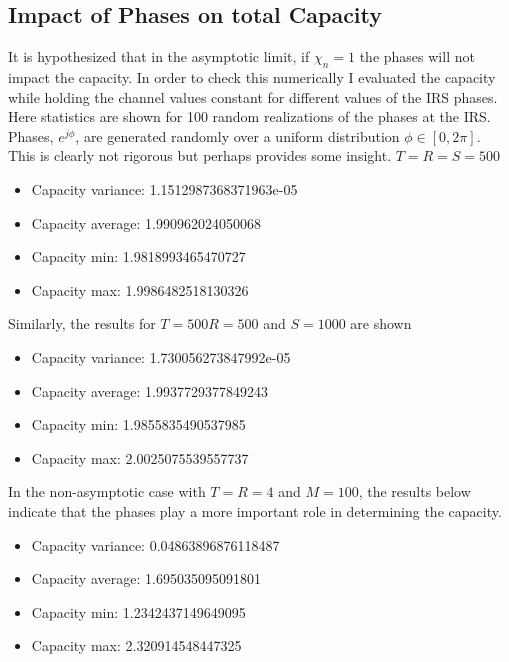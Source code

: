 \documentclass[12pt,a4paper]{report}
\begin{document}
\subsection{Impact of Phases on total Capacity}\label{phase_impact}
It is hypothesized that in the asymptotic limit, if $\chi_n = 1$ the phases will not impact the capacity. In order to check this numerically I evaluated the capacity while holding the channel values constant for different values of the IRS phases. Here statistics are shown for 100 random realizations of the phases at the IRS. 
Phases, $e^{j\phi}$, are generated randomly over a uniform distribution $\phi \in [0,2\pi]$. This is clearly not rigorous but perhaps provides some insight. 
$T = R = S = 500$
\begin{itemize}
\item
Capacity variance:
 1.1512987368371963e-05
 \item
Capacity average:
 1.990962024050068
 \item
Capacity min:
 1.9818993465470727
 \item
Capacity max:
 1.9986482518130326
\end{itemize}
Similarly, the results for $T = 500 R = 500$ and $S = 1000$ are shown 
\begin{itemize}
\item
Capacity variance:
 1.730056273847992e-05
 \item 
Capacity average:
 1.9937729377849243
 \item
Capacity min:
 1.9855835490537985
 \item
Capacity max:
 2.0025075539557737
\end{itemize}


In the non-asymptotic case with $T = R = 4$ and $M = 100$, the results below indicate that the phases play a more important role in determining the capacity. 

\begin{itemize}
\item 
Capacity variance:
 0.04863896876118487
 \item
Capacity average:
 1.695035095091801
 \item
Capacity min:
 1.2342437149649095
 \item
Capacity max:
 2.320914548447325
\end{itemize}






\end{document}
